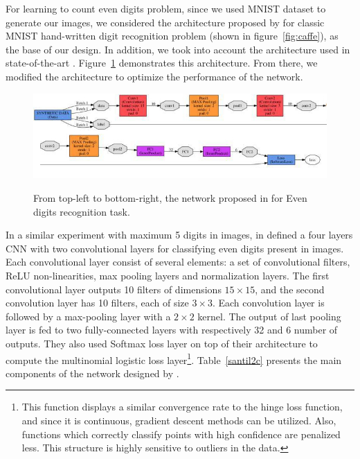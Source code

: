 For learning to count even digits problem, since we used MNIST dataset to generate our images, we considered the architecture proposed by \citeauthor{lecun1995comparison} for classic MNIST hand-written digit recognition problem \cite{lecun1995comparison} (shown in figure~\ref{fig:caffe}), as the base of our design. In addition, we took into account the architecture used in state-of-the-art \cite{segui2015learning}. Figure~\ref{santil2cfull} demonstrates this architecture. From there, we modified the architecture to optimize the performance of the network. 
 
\begin{figure}[H]
  \centering
   {\includegraphics[width=1.\textwidth]{images/santil2cfull}}
	\caption{From top-left to bottom-right, the network proposed in \cite{segui2015learning} for Even digits recognition task.}
	\label{santil2cfull}
\end{figure}

\noindent In a similar experiment with maximum 5 digits in images, \citeauthor{segui2015learning} in \cite{segui2015learning} defined a four layers CNN with two convolutional layers for classifying even digits present in images. Each convolutional layer consist of several elements: a set of convolutional filters, ReLU non-linearities, max pooling layers and normalization layers. The first convolutional layer outputs 10 filters of dimensions $15\times15$, and the second convolution layer has 10 filters, each of size $3\times3$. Each convolution layer is followed by a max-pooling layer with a $2\times2$ kernel. The output of last pooling layer is fed to two fully-connected layers with respectively 32 and 6 number of outputs. They also used Softmax loss layer on top of their architecture to compute the multinomial logistic loss layer\footnote{This function displays a similar convergence rate to the hinge loss function, and since it is continuous, gradient descent methods can be utilized. Also, functions which correctly classify points with high confidence are penalized less. This structure is highly sensitive to outliers in the data.}. Table~\ref{santil2c} presents the main components of the network designed by \cite{segui2015learning}. 

